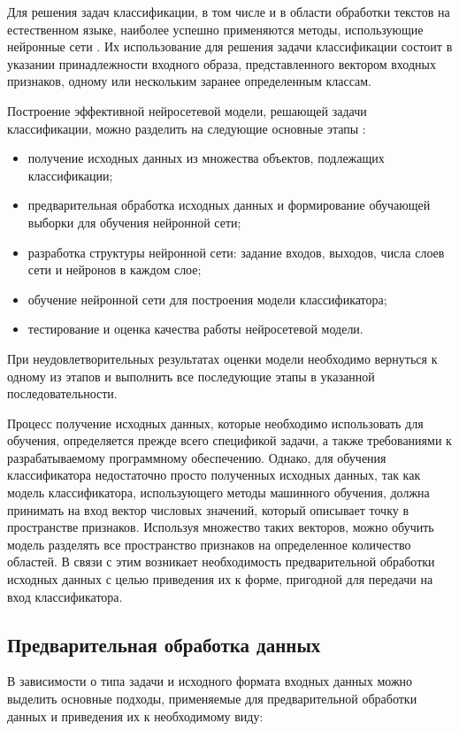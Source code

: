 Для решения задач классификации, в том числе и в области обработки текстов на естественном языке, наиболее успешно применяются методы, использующие нейронные сети \cite{golovko-neural-networks}. Их использование для решения задачи классификации состоит в указании принадлежности входного образа, представленного вектором входных признаков, одному или нескольким заранее определенным классам.

Построение эффективной нейросетевой модели, решающей задачи классификации, можно разделить на следующие основные этапы \cite{golovko-neural-networks}:
\begin{itemize}
	\item получение исходных данных из множества объектов, подлежащих классификации;
	\item предварительная обработка исходных данных и формирование обучающей выборки для обучения нейронной сети;
	\item разработка структуры нейронной сети: задание входов, выходов, числа слоев сети и нейронов в каждом слое;
	\item обучение нейронной сети для построения модели классификатора;
	\item тестирование и оценка качества работы нейросетевой модели.
\end{itemize}

При неудовлетворительных результатах оценки модели необходимо вернуться к одному из этапов и выполнить все последующие этапы в указанной последовательности.

Процесс получение исходных данных, которые необходимо использовать для обучения, определяется прежде всего спецификой задачи, а также требованиями к разрабатываемому программному обеспечению. Однако, для обучения классификатора недостаточно просто полученных исходных данных, так как модель классификатора, использующего методы машинного обучения, должна принимать на вход вектор числовых значений, который описывает точку в пространстве признаков. Используя множество таких векторов, можно обучить модель разделять все пространство признаков на определенное количество областей. В связи с этим возникает необходимость предварительной обработки исходных данных с целью приведения их к форме, пригодной для передачи на вход классификатора. 

\subsection{Предварительная обработка данных}
 В зависимости о типа задачи и исходного формата входных данных можно выделить основные подходы, применяемые для предварительной обработки данных и приведения их к необходимому виду:
 
